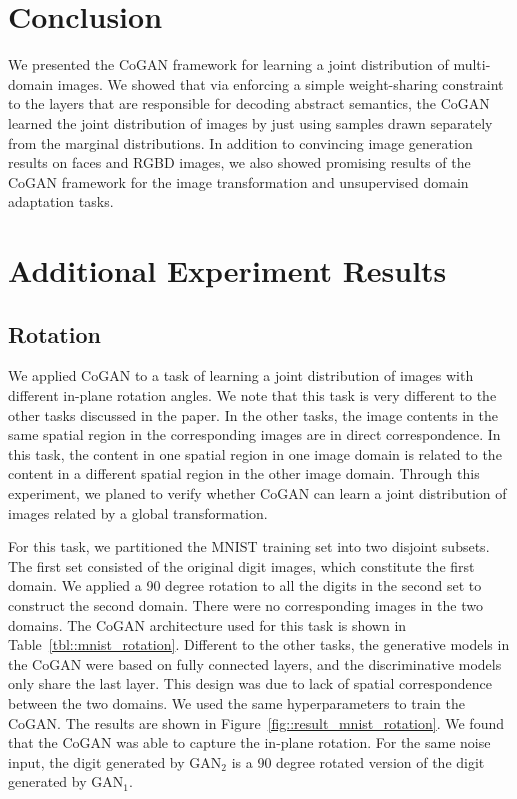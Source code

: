 \documentclass{article}
\begin{document}
\section{Conclusion}\label{sec::conc}

We presented the CoGAN framework for learning a joint distribution of multi-domain images. We showed that via enforcing a simple weight-sharing constraint to the layers that are responsible for decoding abstract semantics, the CoGAN learned the joint distribution of images by just using samples drawn separately from the marginal distributions. In addition to convincing image generation results on faces and RGBD images, we also showed promising results of the CoGAN framework for the image transformation and unsupervised domain adaptation tasks.
 
{
\small


}


\clearpage
\appendix
\clearpage

\section{Additional Experiment Results}\label{subsec::digits}

\subsection{Rotation}

We applied CoGAN to a task of learning a joint distribution of images with different in-plane rotation angles. We note that this task is very different to the other tasks discussed in the paper. In the other tasks, the image contents in the same spatial region in the corresponding images are in direct correspondence. In this task, the content in one spatial region in one image domain is related to the content in a different spatial region in the other image domain. Through this experiment, we planed to verify whether CoGAN can learn a joint distribution of images related by a global transformation.

For this task, we partitioned the MNIST training set into two disjoint subsets. The first set consisted of the original digit images, which constitute the first domain. We applied a 90 degree rotation to all the digits in the second set to construct the second domain. There were no corresponding images in the two domains. The CoGAN architecture used for this task is shown in Table~\ref{tbl::mnist_rotation}. Different to the other tasks, the generative models in the CoGAN were based on fully connected layers, and the discriminative models only share the last layer. This design was due to lack of spatial correspondence between the two domains. We used the same hyperparameters to train the CoGAN. The results are shown in Figure~\ref{fig::result_mnist_rotation}. We found that the CoGAN was able to capture the in-plane rotation. For the same noise input, the digit generated by $\text{GAN}_2$ is a 90 degree rotated version of the digit generated by $\text{GAN}_1$.
\end{document}

